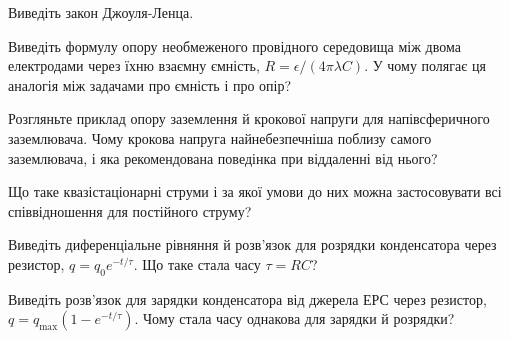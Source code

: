 \begin{Questions}
\begin{quizlist}
	\item Виведіть закон Джоуля-Ленца.
	\item Виведіть формулу опору необмеженого провідного середовища між двома електродами через їхню взаємну ємність, $R = \epsilon/(4\pi\lambda C)$. У чому полягає ця аналогія між задачами про ємність і про опір?
	\item Розгляньте приклад опору заземлення й крокової напруги для напівсферичного заземлювача. Чому крокова напруга найнебезпечніша поблизу самого заземлювача, і яка рекомендована поведінка при віддаленні від нього?
	\item Що таке квазістаціонарні струми і за якої умови до них можна застосовувати всі співвідношення для постійного струму?
	\item Виведіть диференціальне рівняння й розв'язок для розрядки конденсатора через резистор, $q=q_0e^{-t/\tau}$. Що таке стала часу $\tau=RC$?
	\item Виведіть розв'язок для зарядки конденсатора від джерела ЕРС через резистор, $q=q_{\max}(1-e^{-t/\tau})$. Чому стала часу однакова для зарядки й розрядки?
\end{quizlist}
\end{Questions}
